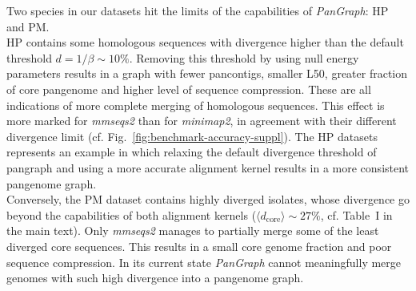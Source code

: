 \documentclass[aps,rmp,reprint,superscriptaddress,notitlepage,10pt,onecolumn]{revtex4-1}
\newcommand{\dcore}{\langle d_\text{core} \rangle}
\begin{document}
Two species in our datasets hit the limits of the capabilities of \textit{PanGraph}: HP and PM.\\
HP contains some homologous sequences with divergence higher than the default threshold $d = 1/\beta \sim 10\%$. Removing this threshold by using null energy parameters results in a graph with fewer pancontigs, smaller L50, greater fraction of core pangenome and higher level of sequence compression. These are all indications of more complete merging of homologous sequences. This effect is more marked for \textit{mmseqs2} than for \textit{minimap2}, in agreement with their different divergence limit (cf. Fig.~\ref{fig:benchmark-accuracy-suppl}). The HP datasets represents an example in which relaxing the default divergence threshold of pangraph and using a more accurate alignment kernel results in a more consistent pangenome graph.\\
Conversely, the PM dataset contains highly diverged isolates, whose divergence go beyond the capabilities of both alignment kernels ($\dcore \sim 27 \%$, cf. Table~I in the main text). Only \textit{mmseqs2} manages to partially merge some of the least diverged core sequences. This results in a small core genome fraction and poor sequence compression. In its current state \textit{PanGraph} cannot meaningfully merge genomes with such high divergence into a pangenome graph.
\end{document}
